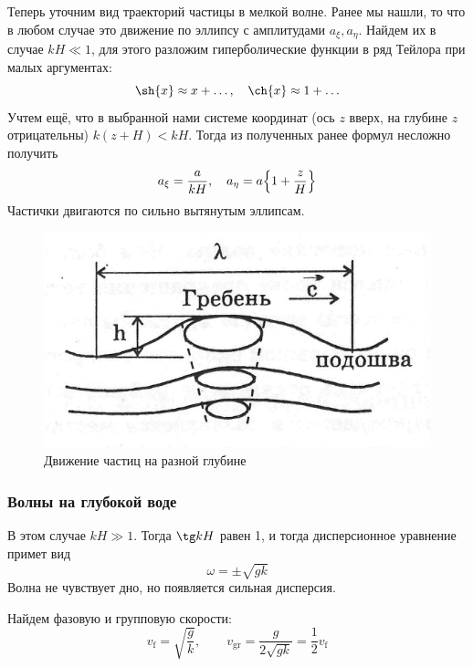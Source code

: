Теперь уточним вид траекторий частицы в мелкой волне. Ранее мы нашли, то что в любом случае это движение по эллипсу с амплитудами $a_\xi, a_\eta$. Найдем их в случае $kH\ll 1$, для этого разложим гиперболические функции  в ряд Тейлора при малых аргументах:
\begin{equation}
    \sh{x}\approx x+\ldots, \quad \ch{x}\approx 1+\ldots
\end{equation}
Учтем ещё, что в выбранной нами системе координат (ось $z$ вверх, на глубине $z$ отрицательны) $k(z+H)<kH$. Тогда из полученных ранее формул несложно получить
\begin{equation}
    a_\xi = \frac{a}{kH}, \quad
    a_\eta = a\qty{1+\frac{z}{H}}
\end{equation}
Частички двигаются по сильно вытянутым эллипсам.

\begin{figure}[H]
    \centering
    \includegraphics[scale=0.5]{photo/ellipse2.png}
    \caption{Движение частиц на разной глубине}
    \label{fig:ellipse2}
\end{figure}



\subsubsection{Волны на глубокой воде}

В этом случае $kH \gg 1$. Тогда $\tg kH$ равен 1, и тогда дисперсионное уравнение примет вид
\begin{equation}
	\omega=\pm\sqrt{gk}
\end{equation}
Волна не чувствует дно, но появляется сильная дисперсия. 

Найдем фазовую и групповую скорости:
\begin{equation}
	v_\text{f}=\sqrt{\frac{g}{k}}, \qquad v_\text{gr}=\frac{g}{2\sqrt{gk}}=\frac12 v_\text{f}
\end{equation}


